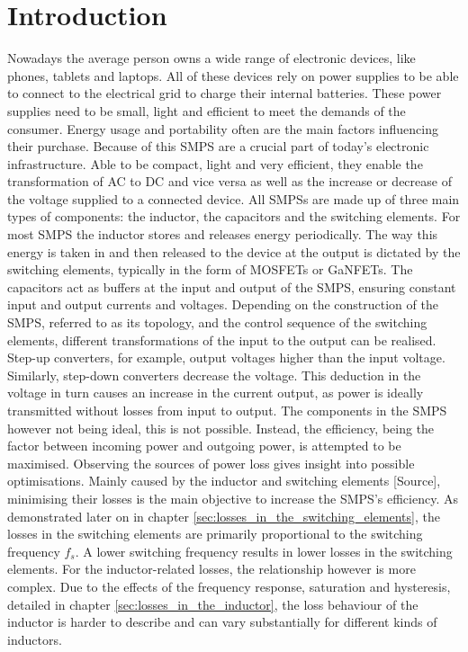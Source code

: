 \chapter{Introduction} \label{sec:intro}
Nowadays the average person owns a wide range of electronic devices, like phones, tablets and laptops. All of these devices rely on power supplies to be able to connect to the electrical grid to charge their internal batteries. These power supplies need to be small, light and efficient to meet the demands of the consumer. Energy usage and portability often are the main factors influencing their purchase. Because of this \ac{SMPS} are a crucial part of today's electronic infrastructure. Able to be compact, light and very efficient, they enable the transformation of \ac{AC} to \ac{DC} and vice versa as well as the increase or decrease of the voltage supplied to a connected device. All \acp{SMPS} are made up of three main types of components: the inductor, the capacitors and the switching elements. For most \ac{SMPS} the inductor stores and releases energy periodically. The way this energy is taken in and then released to the device at the output is dictated by the switching elements, typically in the form of \acp{MOSFET} or \acp{GaNFET}. The capacitors act as buffers at the input and output of the \ac{SMPS}, ensuring constant input and output currents and voltages. Depending on the construction of the \ac{SMPS}, referred to as its topology, and the control sequence of the switching elements, different transformations of the input to the output can be realised. Step-up converters, for example, output voltages higher than the input voltage. Similarly, step-down converters decrease the voltage. This deduction in the voltage in turn causes an increase in the current output, as power is ideally transmitted without losses from input to output. The components in the \ac{SMPS} however not being ideal, this is not possible. Instead, the efficiency, being the factor between incoming power and outgoing power, is attempted to be maximised. Observing the sources of power loss gives insight into possible optimisations. Mainly caused by the inductor and switching elements [Source], minimising their losses is the main objective to increase the \ac{SMPS}'s efficiency. As demonstrated later on in chapter \ref{sec:losses_in_the_switching_elements}, the losses in the switching elements are primarily proportional to the switching frequency $f_s$. A lower switching frequency results in lower losses in the switching elements. For the inductor-related losses, the relationship however is more complex. Due to the effects of the frequency response, saturation and hysteresis, detailed in chapter \ref{sec:losses_in_the_inductor}, the loss behaviour of the inductor is harder to describe and can vary substantially for different kinds of inductors.\\
